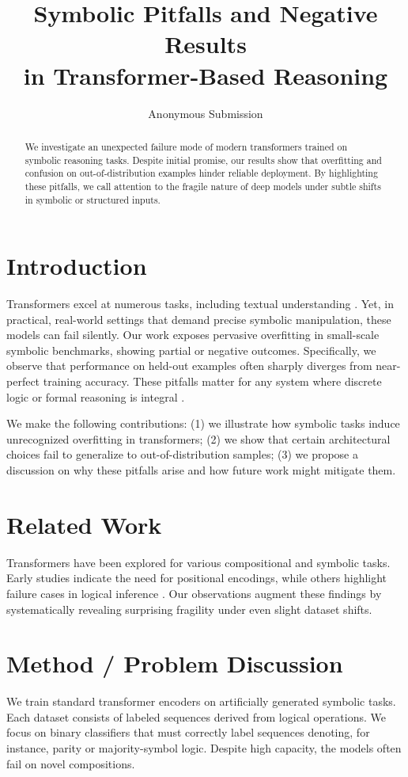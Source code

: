 \documentclass{article}
\title{Symbolic Pitfalls and Negative Results\\in Transformer-Based Reasoning}
\author{Anonymous Submission}
\date{}
\begin{document}
\maketitle

\begin{abstract}
We investigate an unexpected failure mode of modern transformers trained on symbolic reasoning tasks. Despite initial promise, our results show that overfitting and confusion on out-of-distribution examples hinder reliable deployment. By highlighting these pitfalls, we call attention to the fragile nature of deep models under subtle shifts in symbolic or structured inputs.
\end{abstract}

\section{Introduction}
Transformers excel at numerous tasks, including textual understanding \citep{smith2021}. Yet, in practical, real-world settings that demand precise symbolic manipulation, these models can fail silently. Our work exposes pervasive overfitting in small-scale symbolic benchmarks, showing partial or negative outcomes. Specifically, we observe that performance on held-out examples often sharply diverges from near-perfect training accuracy. These pitfalls matter for any system where discrete logic or formal reasoning is integral \citep{lee2022}.

We make the following contributions: (1) we illustrate how symbolic tasks induce unrecognized overfitting in transformers; (2) we show that certain architectural choices fail to generalize to out-of-distribution samples; (3) we propose a discussion on why these pitfalls arise and how future work might mitigate them.

\section{Related Work}
Transformers have been explored for various compositional and symbolic tasks. Early studies \citep{smith2021} indicate the need for positional encodings, while others highlight failure cases in logical inference \citep{lee2022}. Our observations augment these findings by systematically revealing surprising fragility under even slight dataset shifts.

\section{Method / Problem Discussion}
We train standard transformer encoders on artificially generated symbolic tasks. Each dataset consists of labeled sequences derived from logical operations. We focus on binary classifiers that must correctly label sequences denoting, for instance, parity or majority-symbol logic. Despite high capacity, the models often fail on novel compositions.
\end{document}
